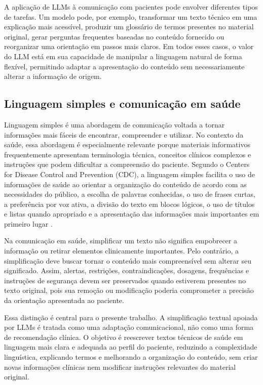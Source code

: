 A aplicação de LLMs à comunicação com pacientes pode envolver diferentes tipos de tarefas. Um modelo pode, por exemplo, transformar um texto técnico em uma explicação mais acessível, produzir um glossário de termos presentes no material original, gerar perguntas frequentes baseadas no conteúdo fornecido ou reorganizar uma orientação em passos mais claros. Em todos esses casos, o valor do LLM está em sua capacidade de manipular a linguagem natural de forma flexível, permitindo adaptar a apresentação do conteúdo sem necessariamente alterar a informação de origem.

\subsection{Linguagem simples e comunicação em saúde}
\label{sec:linguagem-simples-comunicacao-saude}

Linguagem simples é uma abordagem de comunicação voltada a tornar informações mais fáceis de encontrar, compreender e utilizar. No contexto da saúde, essa abordagem é especialmente relevante porque materiais informativos frequentemente apresentam terminologia técnica, conceitos clínicos complexos e instruções que podem dificultar a compreensão do paciente. Segundo o Centers for Disease Control and Prevention (CDC), a linguagem simples facilita o uso de informações de saúde ao orientar a organização do conteúdo de acordo com as necessidades do público, a escolha de palavras conhecidas, o uso de frases curtas, a preferência por voz ativa, a divisão do texto em blocos lógicos, o uso de títulos e listas quando apropriado e a apresentação das informações mais importantes em primeiro lugar \cite{cdc2025plainlanguage}.

Na comunicação em saúde, simplificar um texto não significa empobrecer a informação ou retirar elementos clinicamente importantes. Pelo contrário, a simplificação deve buscar tornar o conteúdo mais compreensível sem alterar seu significado. Assim, alertas, restrições, contraindicações, dosagens, frequências e instruções de segurança devem ser preservados quando estiverem presentes no texto original, pois sua remoção ou modificação poderia comprometer a precisão da orientação apresentada ao paciente.

Essa distinção é central para o presente trabalho. A simplificação textual apoiada por LLMs é tratada como uma adaptação comunicacional, não como uma forma de recomendação clínica. O objetivo é reescrever textos técnicos de saúde em linguagem mais clara e adequada ao perfil do paciente, reduzindo a complexidade linguística, explicando termos e melhorando a organização do conteúdo, sem criar novas informações clínicas nem modificar instruções relevantes do material original.

